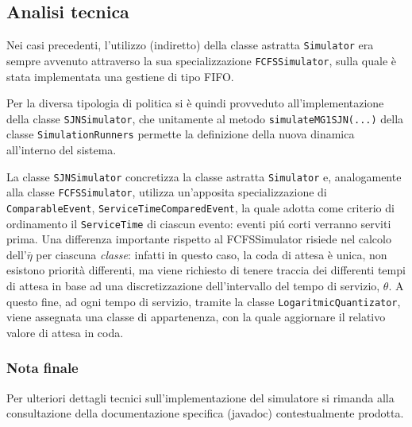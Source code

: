 \subsection{Analisi tecnica}

Nei casi precedenti, l'utilizzo (indiretto) della classe astratta {\tt Simulator} era sempre avvenuto attraverso la sua specializzazione {\tt FCFSSimulator}, sulla quale \`e stata implementata una gestiene di tipo FIFO.

Per la diversa tipologia di politica si \`e quindi provveduto all'implementazione della classe {\tt SJNSimulator}, che unitamente al metodo {\tt simulateMG1SJN(...)} della classe {\tt SimulationRunners} permette la definizione della nuova dinamica all'interno del sistema.

La classe {\tt SJNSimulator} concretizza la classe astratta {\tt Simulator} e, analogamente alla classe {\tt FCFSSimulator}, utilizza un'apposita specializzazione di {\tt ComparableEvent}, {\tt ServiceTimeComparedEvent}, la quale adotta come criterio di ordinamento il {\tt ServiceTime} di ciascun evento: eventi pi\'u corti verranno serviti prima. Una differenza importante rispetto al FCFSSimulator risiede nel calcolo dell'$\overline{\eta}$ per ciascuna \emph{classe}: infatti in questo caso, la coda di attesa \`e unica, non esistono priorit\`a differenti, ma viene richiesto di tenere traccia dei differenti tempi di attesa in base ad una discretizzazione dell'intervallo del tempo di servizio, $\theta$. A questo fine, ad ogni tempo di servizio, tramite la classe {\tt LogaritmicQuantizator}, viene assegnata una classe di appartenenza, con la quale aggiornare il relativo valore di attesa in coda.

\subsubsection{Nota finale}
Per ulteriori dettagli tecnici sull'implementazione del simulatore si rimanda alla consultazione della documentazione specifica (javadoc) contestualmente prodotta.
